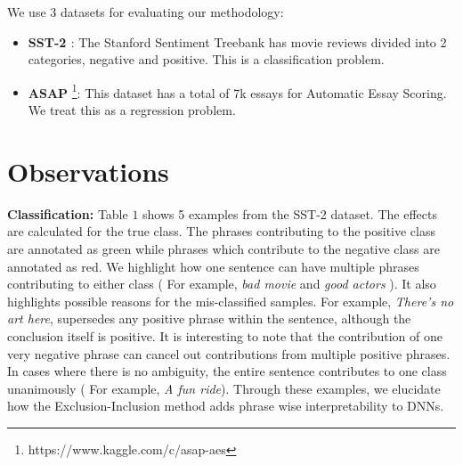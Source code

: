\documentclass[11pt]{article}
\begin{document}
We use 3 datasets for evaluating our methodology:
 \begin{itemize}
     \item \textbf{SST-2 \cite{socher2013recursive}}: The Stanford Sentiment Treebank has movie reviews divided into 2 categories, negative and positive. This is a classification problem.
     \item \textbf{ASAP} \footnote{https://www.kaggle.com/c/asap-aes}: This dataset has a total of 7k essays for Automatic Essay Scoring. We treat this as a regression problem. 
    
 \end{itemize}
 


\section{Observations}

\textbf{Classification: } Table $1$ shows 5 examples from the SST-2 dataset. The effects are calculated for the true class. The phrases contributing to the positive class are annotated as green while phrases which contribute to the negative class are annotated as red. We highlight how one sentence can have multiple phrases contributing to either class ( For example, \textit{ bad movie} and \textit{good actors} ).
It also highlights possible reasons for the mis-classified samples. For example, \textit{There's no art here}, supersedes any positive phrase within the sentence, although the conclusion itself is positive. It is interesting to note that the contribution of one very negative phrase can cancel out contributions from multiple positive phrases. In cases where there is no ambiguity, the entire sentence contributes to one class unanimously ( For example, \textit{A fun ride}). Through these examples, we elucidate how the Exclusion-Inclusion method adds phrase wise interpretability to DNNs.
\end{document}
